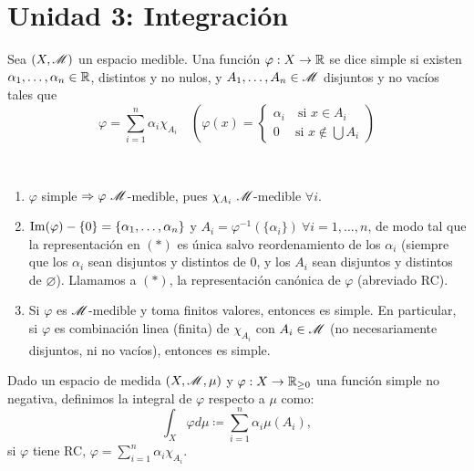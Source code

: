 
\chapter{Unidad 3: Integración}

\begin{definition}
	Sea $(X, \mathscr{M})$ un espacio medible. Una función $\varphi : X \to \mathbb{R}$ se dice simple si existen $\alpha_{1},\dots,\alpha_{n} \in \mathbb{R}$, distintos y no nulos, y $A_{1},\dots,A_{n} \in \mathscr{M}$ disjuntos y no vacíos tales que
	\[ \varphi = \sum_{i=1}^{n} \alpha_{i} \chi_{A_{i}} \quad \left( \varphi(x) = \begin{cases}
		\alpha_{i} \quad \text{si } x \in A_{i} \\
		0 \quad \ \text{si } x \not\in \bigcup A_{i}
	\end{cases} \right) \tag{$*$} \]
\end{definition}
\begin{remark}~
	\begin{enumerate}
		\item $\varphi$ simple $\implies \varphi \ \mscr{M}$-medible, pues $\chi_{A_{i}} \ \mscr{M}$-medible $\forall i$.

		\item $\operatorname{Im}(\varphi) - \{0\} = \{\alpha_{1},\dots,\alpha_{n}\}$ y $A_{i} = \varphi^{-1}(\{\alpha_{i}\}) \ \forall i = 1, \dots, n$, de modo tal que la representación en $(*)$ es única salvo reordenamiento de los $\alpha_{i}$ (siempre que los $\alpha_{i}$ sean disjuntos y distintos de $0$, y los $A_{i}$ sean disjuntos y distintos de $\varnothing$). Llamamos a $(*)$, la representación canónica de $\varphi$ (abreviado RC).

		\item Si $\varphi$ es $\mathscr{M}$-medible y toma finitos valores, entonces es simple. En particular, si $\varphi$ es combinación linea (finita) de $\chi_{A_{i}}$ con $A_{i} \in \mathscr{M}$ (no necesariamente disjuntos, ni no vacíos), entonces es simple.
	\end{enumerate}
\end{remark}

\begin{definition}
	Dado un espacio de medida $(X, \mathscr{M}, \mu)$ y $\varphi : X \to \mathbb{R}_{\geq 0}$ una función simple no negativa, definimos la integral de $\varphi$ respecto a $\mu$ como:
	\[ \int_{X} \varphi d\mu \coloneq \sum_{i=1}^{n} \alpha_{i} \mu(A_{i}), \]
	si $\varphi$ tiene RC, $\varphi = \sum_{i=1}^{n} \alpha_{i} \chi_{A_{i}}$.
\end{definition}

